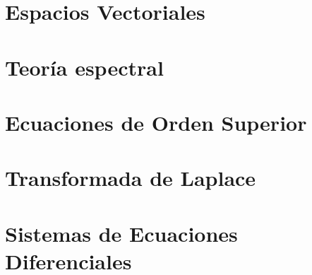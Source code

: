 \documentclass{tufte-book}
\begin{document}
\chapter{Espacios Vectoriales}







\chapter{Teoría espectral}




\chapter{Ecuaciones de Orden Superior}








\chapter{Transformada de Laplace}






\chapter{Sistemas de Ecuaciones Diferenciales}




%
{}

\end{document}
